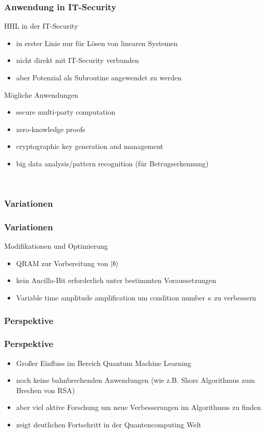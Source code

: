 \begin{frame}
    \frametitle{Anwendung in IT-Security}

    HHL in der IT-Security
    \begin{itemize}
        \item in erster Linie nur für Lösen von linearen Systemen
        \item nicht direkt mit IT-Security verbunden
        \item aber Potenzial als Subroutine angewendet zu werden
    \end{itemize}

    \hfil

    Mögliche Anwendungen
     \begin{itemize}
        \item secure multi-party computation 
        \item zero-knowledge proofs
        \item cryptographic key generation and management
        \item big data analysis/pattern recognition (für Betrugserkennung)

    \end{itemize}
\   
\end{frame}

\subsubsection{Variationen}
\begin{frame}
    \frametitle{Variationen}

    Modifikationen und Optimierung
    \begin{itemize}
        \item QRAM zur Vorbereitung von $\ket{b}$
        \item kein Ancilla-Bit erforderlich unter bestimmten Voraussetzungen 
        \item Variable time amplitude amplification um condition number $\kappa$ zu verbessern
    \end{itemize}
    
\end{frame}

\subsubsection{Perspektive}
\begin{frame}
    \frametitle{Perspektive}

    \begin{itemize}
        \item  Großer Einfluss im Bereich Quantum Machine Learning 
        \item  noch keine bahnbrechenden Anwendungen (wie z.B. Shors Algorithmus zum Brechen von RSA)
        \item  aber viel aktive Forschung um neue Verbesserungen im Algorithmus zu finden
        \item  zeigt deutlichen Fortschritt in der Quantencomputing Welt
    \end{itemize}
    
\end{frame}

